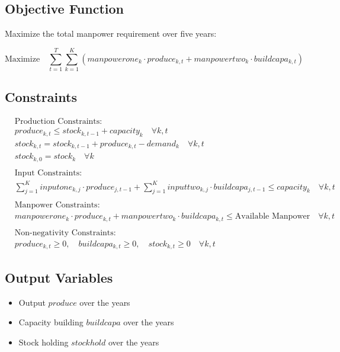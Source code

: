 \documentclass{article}
\begin{document}
\subsection*{Objective Function}
Maximize the total manpower requirement over five years:

\[
\text{Maximize} \quad \sum_{t=1}^{T} \sum_{k=1}^{K} (manpowerone_k \cdot produce_{k,t} + manpowertwo_k \cdot buildcapa_{k,t})
\]

\subsection*{Constraints}

\begin{align}
    & \text{Production Constraints:} \\
    & produce_{k,t} \leq stock_{k,t-1} + capacity_k \quad \forall k, t \\
    & stock_{k,t} = stock_{k,t-1} + produce_{k,t} - demand_k \quad \forall k, t \\
    & stock_{k,0} = stock_k \quad \forall k \\
    \\
    & \text{Input Constraints:} \\
    & \sum_{j=1}^{K} inputone_{k,j} \cdot produce_{j,t-1} + \sum_{j=1}^{K} inputtwo_{k,j} \cdot buildcapa_{j,t-1} \leq capacity_k \quad \forall k, t \\
    \\
    & \text{Manpower Constraints:} \\
    & manpowerone_k \cdot produce_{k,t} + manpowertwo_k \cdot buildcapa_{k,t} \leq \text{Available Manpower} \quad \forall k, t \\
    \\
    & \text{Non-negativity Constraints:} \\
    & produce_{k,t} \geq 0, \quad buildcapa_{k,t} \geq 0, \quad stock_{k,t} \geq 0 \quad \forall k, t
\end{align}

\subsection*{Output Variables}
\begin{itemize}
    \item Output $produce$ over the years
    \item Capacity building $buildcapa$ over the years
    \item Stock holding $stockhold$ over the years
\end{itemize}
\end{document}
